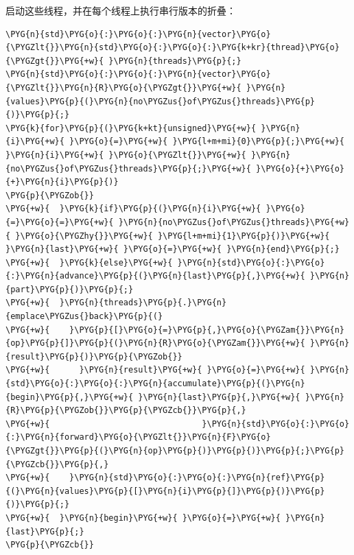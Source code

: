 
启动这些线程，并在每个线程上执行串行版本的折叠：



\begin{codeblockbg}
\begin{Verbatim}[commandchars=\\\{\},breaklines=true,breakanywhere=true,fontsize=\codefont,xleftmargin=17bp]
\PYG{n}{std}\PYG{o}{:}\PYG{o}{:}\PYG{n}{vector}\PYG{o}{\PYGZlt{}}\PYG{n}{std}\PYG{o}{:}\PYG{o}{:}\PYG{k+kr}{thread}\PYG{o}{\PYGZgt{}}\PYG{+w}{ }\PYG{n}{threads}\PYG{p}{;}
\PYG{n}{std}\PYG{o}{:}\PYG{o}{:}\PYG{n}{vector}\PYG{o}{\PYGZlt{}}\PYG{n}{R}\PYG{o}{\PYGZgt{}}\PYG{+w}{ }\PYG{n}{values}\PYG{p}{(}\PYG{n}{no\PYGZus{}of\PYGZus{}threads}\PYG{p}{)}\PYG{p}{;}
\PYG{k}{for}\PYG{p}{(}\PYG{k+kt}{unsigned}\PYG{+w}{ }\PYG{n}{i}\PYG{+w}{ }\PYG{o}{=}\PYG{+w}{ }\PYG{l+m+mi}{0}\PYG{p}{;}\PYG{+w}{ }\PYG{n}{i}\PYG{+w}{ }\PYG{o}{\PYGZlt{}}\PYG{+w}{ }\PYG{n}{no\PYGZus{}of\PYGZus{}threads}\PYG{p}{;}\PYG{+w}{ }\PYG{o}{+}\PYG{o}{+}\PYG{n}{i}\PYG{p}{)}
\PYG{p}{\PYGZob{}}
\PYG{+w}{  }\PYG{k}{if}\PYG{p}{(}\PYG{n}{i}\PYG{+w}{ }\PYG{o}{=}\PYG{o}{=}\PYG{+w}{ }\PYG{n}{no\PYGZus{}of\PYGZus{}threads}\PYG{+w}{ }\PYG{o}{\PYGZhy{}}\PYG{+w}{ }\PYG{l+m+mi}{1}\PYG{p}{)}\PYG{+w}{ }\PYG{n}{last}\PYG{+w}{ }\PYG{o}{=}\PYG{+w}{ }\PYG{n}{end}\PYG{p}{;}
\PYG{+w}{  }\PYG{k}{else}\PYG{+w}{ }\PYG{n}{std}\PYG{o}{:}\PYG{o}{:}\PYG{n}{advance}\PYG{p}{(}\PYG{n}{last}\PYG{p}{,}\PYG{+w}{ }\PYG{n}{part}\PYG{p}{)}\PYG{p}{;}
\PYG{+w}{  }\PYG{n}{threads}\PYG{p}{.}\PYG{n}{emplace\PYGZus{}back}\PYG{p}{(}
\PYG{+w}{    }\PYG{p}{[}\PYG{o}{=}\PYG{p}{,}\PYG{o}{\PYGZam{}}\PYG{n}{op}\PYG{p}{]}\PYG{p}{(}\PYG{n}{R}\PYG{o}{\PYGZam{}}\PYG{+w}{ }\PYG{n}{result}\PYG{p}{)}\PYG{p}{\PYGZob{}}
\PYG{+w}{      }\PYG{n}{result}\PYG{+w}{ }\PYG{o}{=}\PYG{+w}{ }\PYG{n}{std}\PYG{o}{:}\PYG{o}{:}\PYG{n}{accumulate}\PYG{p}{(}\PYG{n}{begin}\PYG{p}{,}\PYG{+w}{ }\PYG{n}{last}\PYG{p}{,}\PYG{+w}{ }\PYG{n}{R}\PYG{p}{\PYGZob{}}\PYG{p}{\PYGZcb{}}\PYG{p}{,}
\PYG{+w}{                               }\PYG{n}{std}\PYG{o}{:}\PYG{o}{:}\PYG{n}{forward}\PYG{o}{\PYGZlt{}}\PYG{n}{F}\PYG{o}{\PYGZgt{}}\PYG{p}{(}\PYG{n}{op}\PYG{p}{)}\PYG{p}{)}\PYG{p}{;}\PYG{p}{\PYGZcb{}}\PYG{p}{,}
\PYG{+w}{    }\PYG{n}{std}\PYG{o}{:}\PYG{o}{:}\PYG{n}{ref}\PYG{p}{(}\PYG{n}{values}\PYG{p}{[}\PYG{n}{i}\PYG{p}{]}\PYG{p}{)}\PYG{p}{)}\PYG{p}{;}
\PYG{+w}{  }\PYG{n}{begin}\PYG{+w}{ }\PYG{o}{=}\PYG{+w}{ }\PYG{n}{last}\PYG{p}{;}
\PYG{p}{\PYGZcb{}}
\end{Verbatim}
\end{codeblockbg}


